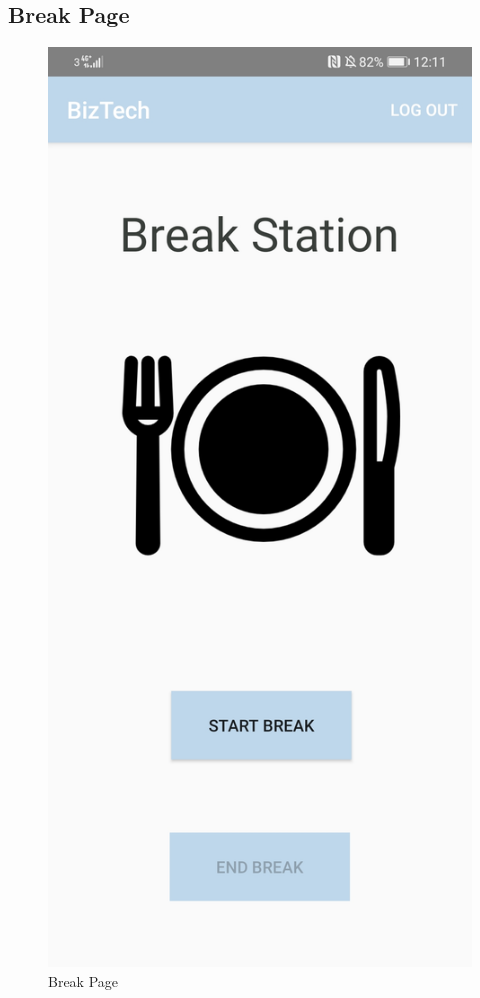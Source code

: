 \subsection{Break Page}
\begin{figure}[!htb]
    \centering
    \includegraphics[scale=0.15]{img/BreakPage.jpg}
    \caption{Break Page}
    \label{fig}
\end{figure}
